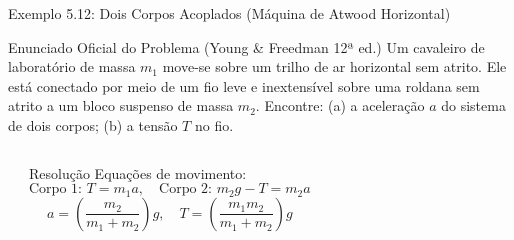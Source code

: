 \documentclass[10pt,aspectratio=169]{beamer}
\begin{document}
\begin{frame}{Exemplo 5.12: Dois Corpos Acoplados (Máquina de Atwood Horizontal)}
    \begin{block}{Enunciado Oficial do Problema (Young \& Freedman 12ª ed.)}
        \small
        Um cavaleiro de laboratório de massa $m_1$ move-se sobre um trilho de ar horizontal sem atrito. Ele está conectado por meio de um fio leve e inextensível sobre uma roldana sem atrito a um bloco suspenso de massa $m_2$. Encontre: (a) a aceleração $a$ do sistema de dois corpos; (b) a tensão $T$ no fio.
    \end{block}
    \begin{columns}[T]
        \begin{center}
        \end{center}
        \begin{exampleblock}{Resolução}
            \small
            Equações de movimento:
            $$\text{Corpo 1: } T = m_1 a, \quad \text{Corpo 2: } m_2 g - T = m_2 a$$
            $$a = \left(\frac{m_2}{m_1 + m_2}\right) g, \quad T = \left(\frac{m_1 m_2}{m_1 + m_2}\right) g$$
        \end{exampleblock}
    \end{columns}
\end{frame}
\end{document}
